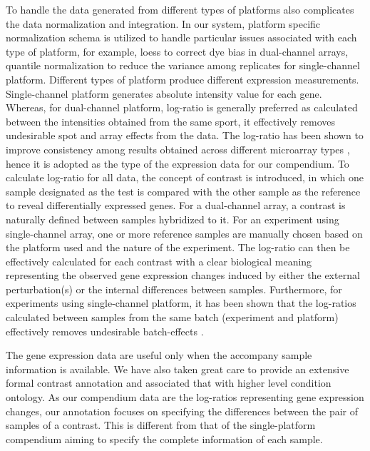 To handle the data generated from different types of platforms also
complicates the data normalization and integration.
%
In our system, platform specific normalization schema is utilized to handle
particular issues associated with each type of platform, for example, loess to
correct dye bias in dual-channel arrays, quantile normalization to reduce the
variance among replicates for single-channel platform.
%
Different types of platform produce different expression measurements.
Single-channel platform generates absolute intensity value for each gene.
Whereas, for dual-channel platform, log-ratio is generally preferred as
calculated between the intensities obtained from the same sport, it
effectively removes undesirable spot and array effects from the data.
%
The log-ratio has been shown to improve consistency among results obtained
across different microarray types \cite{Shi2006}, hence it is adopted as
the type of the expression data for our compendium.
%
To calculate log-ratio for all data, the concept of contrast is introduced,
in which one sample designated as the test is compared with the other
sample as the reference to reveal differentially expressed genes.
%
For a dual-channel array, a contrast is naturally defined between samples
hybridized to it.
%
For an experiment using single-channel array, one or more reference samples
are manually chosen based on the platform used and the nature of the
experiment.
%
The log-ratio can then be effectively calculated for each contrast with a
clear biological meaning representing the observed gene expression
changes induced by either the external perturbation(s) or the internal
differences between samples.
%
Furthermore, for experiments using single-channel platform, it has been shown
that the log-ratios calculated between samples from the same batch (experiment
and platform) effectively removes undesirable batch-effects \cite{Luo2010}.


The gene expression data are useful only when the accompany sample information
is available.  We have also taken great care to provide an extensive formal
contrast annotation and associated that with higher level condition ontology.
%
As our compendium data are the log-ratios representing gene expression
changes, our annotation focuses on specifying the differences between the pair
of samples of a contrast.
%
This is different from that of the single-platform compendium aiming to
specify the complete information of each sample.


